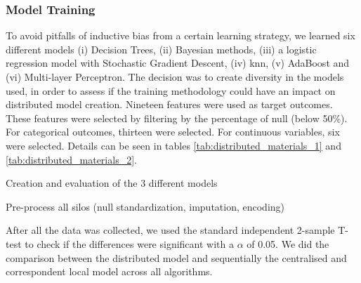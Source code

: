 \subsubsection{Model Training}
To avoid pitfalls of inductive bias from a certain learning strategy, we learned six different models (i) Decision Trees, (ii) Bayesian methods, (iii) a logistic regression model with Stochastic Gradient Descent, (iv) \ac{knn}, (v) AdaBoost and (vi) Multi-layer Perceptron. The decision was to create diversity in the models used, in order to assess if the training methodology could have an impact on distributed model creation.
Nineteen features were used as target outcomes. These features were selected by filtering by the percentage of null (below 50\%). For categorical outcomes, thirteen were selected. For continuous variables, six were selected. Details can be seen in tables \ref{tab:distributed_materials_1} and \ref{tab:distributed_materials_2}.


\begin{algorithm}[hbtp]
\caption{Creation and evaluation of the 3 different models}
\label{alg:distributed_1}
Pre-process all silos (null standardization, imputation, encoding)\;


 \end{algorithm}

After all the data was collected, we used the standard independent 2-sample T-test to check if the differences were significant with a $\alpha$ of 0.05. We did the comparison between the distributed model and sequentially the centralised and correspondent local model across all algorithms.